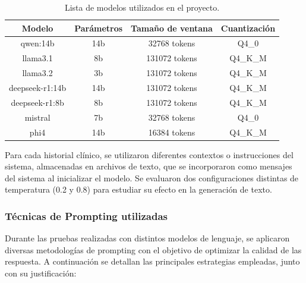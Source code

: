 \documentclass[../main.tex]{subfiles}
\begin{document}
	\begin{table}[h]
		\centering
		\caption{Lista de modelos utilizados en el proyecto.}
		\label{tab:modelos}
		\renewcommand{\arraystretch}{1.2}
		\begin{tabular}{cccc}
			\hline
			\textbf{Modelo} & \textbf{Parámetros}& \textbf{Tamaño de ventana} & \textbf{Cuantización} \\
			\hline
			qwen:14b & 14b & 32768 tokens & Q4\_0 \\
			llama3.1 & 8b & 131072 tokens & Q4\_K\_M  \\
			llama3.2 & 3b & 131072 tokens & Q4\_K\_M  \\
			deepseek-r1:14b & 14b & 131072 tokens & Q4\_K\_M \\
			deepseek-r1:8b & 8b & 131072 tokens & Q4\_K\_M \\
			mistral & 7b & 32768 tokens & Q4\_0 \\
			phi4 & 14b & 16384 tokens & Q4\_K\_M  \\
			\hline
		\end{tabular}
	\end{table}
	
	
	Para cada historial clínico, se utilizaron diferentes contextos o instrucciones del sistema, almacenadas en archivos de texto, que se incorporaron como mensajes del sistema al inicializar el modelo. Se evaluaron dos configuraciones distintas de temperatura (0.2 y 0.8) para estudiar su efecto en la generación de texto. 
	
	
	\subsubsection{Técnicas de Prompting utilizadas}
	
	Durante las pruebas realizadas con distintos modelos de lenguaje, se aplicaron diversas metodologías de prompting con el objetivo de optimizar la calidad de las respuesta. A continuación se detallan las principales estrategias empleadas, junto con su justificación:
	
\end{document}
